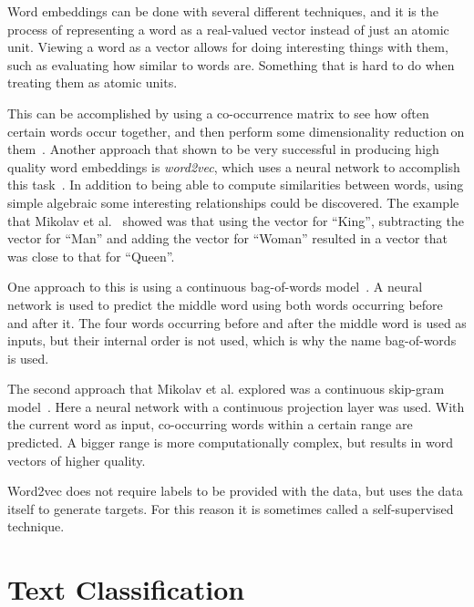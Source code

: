 Word embeddings can be done with several different techniques, and it is the process of representing a word as a real-valued vector instead of just an atomic unit.
Viewing a word as a vector allows for doing interesting things with them, such as evaluating how similar to words are.
Something that is hard to do when treating them as atomic units.

This can be accomplished by using a co-occurrence matrix to see how often certain words occur together, and then perform some dimensionality reduction on them~\cite{lebret2013word, levy2014neural}.
Another approach that shown to be very successful in producing high quality word embeddings is \textit{word2vec}, which uses a neural network to accomplish this task~\cite{mikolov2013efficient}.
In addition to being able to compute similarities between words, using simple algebraic some interesting relationships could be discovered.
The example that Mikolav et al\@.~\cite{mikolov2013efficient} showed was that using the vector for ``King'', subtracting the vector for ``Man'' and adding the vector for ``Woman'' resulted in a vector that was close to that for ``Queen''.

One approach to this is using a continuous bag-of-words model~\cite{mikolov2013efficient}.
A neural network is used to predict the middle word using both words occurring before and after it.
The four words occurring before and after the middle word is used as inputs, but their internal order is not used, which is why the name bag-of-words is used.

The second approach that Mikolav et al\@. explored was a continuous skip-gram model~\cite{mikolov2013efficient}.
Here a neural network with a continuous projection layer was used.
With the current word as input, co-occurring words within a certain range are predicted.
A bigger range is more computationally complex, but results in word vectors of higher quality.

Word2vec does not require labels to be provided with the data, but uses the data itself to generate targets.
For this reason it is sometimes called a self-supervised technique.

\section{Text Classification}

